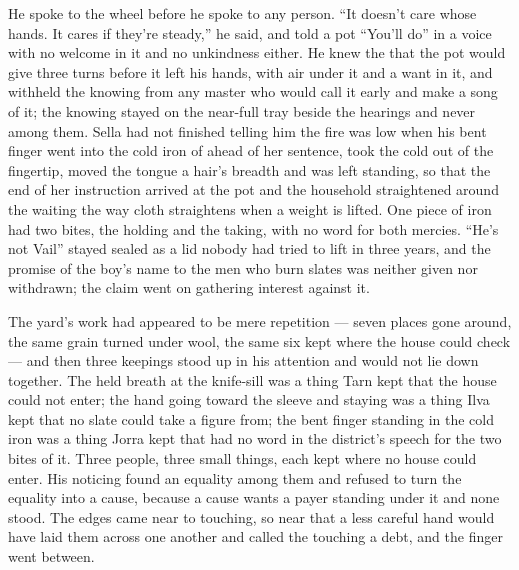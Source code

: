 He spoke to the wheel before he spoke to any person. “It doesn’t care whose hands. It cares if they’re steady,” he said, and told a pot “You’ll do” in a voice with no welcome in it and no unkindness either. He knew the  that the pot would give three turns before it left his hands, with air under it and a want in it, and withheld the knowing from any  master who would call it early and make a song of it; the knowing stayed on the near-full tray beside the hearings and never among them. Sella had not finished telling him the fire was low when his bent finger went into the cold iron of  ahead of her sentence, took the cold out of the fingertip, moved the tongue a hair’s breadth and was left standing, so that the end of her instruction arrived at the pot and the household straightened around the waiting the way cloth straightens when a weight is lifted. One piece of iron had two bites, the holding and the taking, with no  word for both mercies. “He’s not Vail” stayed sealed as a lid nobody had tried to lift in three years, and the promise of the boy’s name to the men who burn slates was neither given nor withdrawn; the claim went on gathering interest against it.

The yard’s work had appeared to be mere repetition --- seven places gone around, the same grain turned under wool, the same six kept where the house could check --- and then three keepings stood up in his attention and would not lie down together. The held breath at the knife-sill was a thing Tarn kept that the house could not enter; the hand going toward the sleeve and staying was a thing Ilva kept that no slate could take a figure from; the bent finger standing in the cold iron was a thing Jorra kept that had no word in the district’s speech for the two bites of it. Three people, three small things, each kept where no house could enter. His noticing found an equality among them and refused to turn the equality into a cause, because a cause wants a payer standing under it and none stood. The edges came near to touching, so near that a less careful hand would have laid them across one another and called the touching a debt, and the finger went between.

